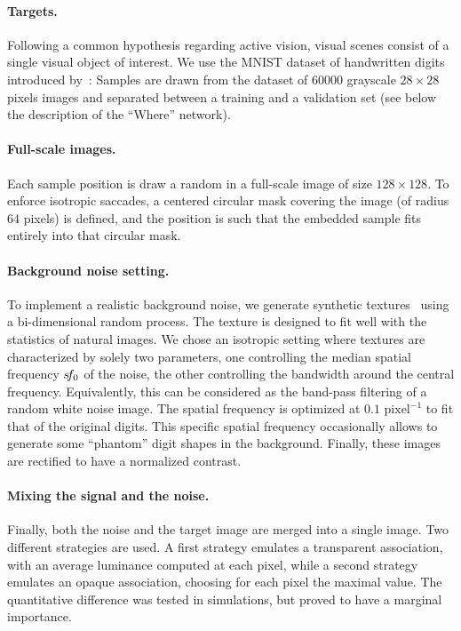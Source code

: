 \paragraph{Targets.} Following a common hypothesis regarding active vision, visual scenes consist of a single visual object of interest. We use the MNIST dataset of handwritten digits introduced by~\cite{Lecun1998}: %
Samples are drawn from the dataset of $60000$ grayscale $28\times 28$ pixels images and separated between a training and a validation set (see below the description of the ``Where'' network).

\paragraph{Full-scale images.} Each sample position is draw a random in a full-scale image of size $128\times 128$. To enforce isotropic saccades, a centered circular mask covering the image (of radius $64$ pixels) is defined, and the position is such that the embedded sample fits entirely into that circular mask.

\paragraph{Background noise setting.} To implement a realistic background noise, we generate synthetic textures~\cite{Sanz12} using a bi-dimensional random process. %
The texture is designed to fit well with the statistics of natural images. We chose an isotropic setting where textures are characterized by solely two parameters, one controlling the median spatial frequency $s\hspace{-2pt}f_0$ of the noise, the other controlling the bandwidth around the central frequency. Equivalently, this can be considered as the band-pass filtering of a random white noise image. The spatial frequency is optimized at $0.1\text{ pixel}^{-1}$ to fit that of the original digits. This specific spatial frequency occasionally allows to generate some ``phantom'' digit shapes in the background. Finally, these images are rectified to have a normalized contrast.

\paragraph{Mixing the signal and the noise.} Finally, both the noise and the target image are merged into a single image. Two different strategies are used. A first strategy emulates a transparent association, with an average luminance computed at each pixel, while a second strategy emulates an opaque association, choosing for each pixel the maximal value. The quantitative difference was tested in simulations, but proved to have a marginal importance.
%
